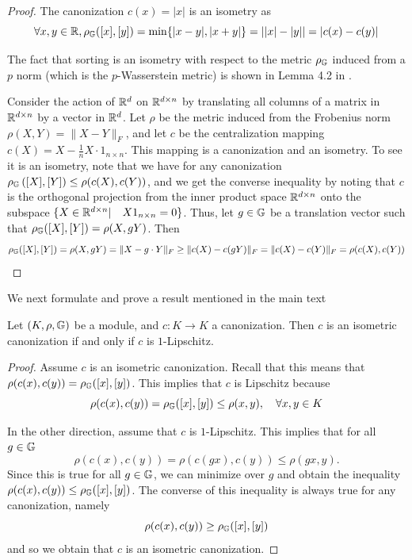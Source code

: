 \documentclass{article}
\begin{document}
\isometries*
\label{Proof_isometries}
\begin{proof}
The  canonization $c(x)=|x|$ is an isometry as
$$\forall x,y \in \mathbb{R}, \rho_{\mathbb{G}}([x],[y]) = \min\{|x-y|,|x+y|\} = ||x|-|y|| = |c(x)-c(y)|$$

The fact that sorting is an isometry with respect to the metric $\rho_{\mathbb{G}}$ induced from a $p$ norm (which is the $p$-Wasserstein metric) is shown in 
 Lemma 4.2 in  \cite{sortLemma}. 

Consider the action of $\mathbb{R}^d$ on $\mathbb{R}^{d\times n}$ by translating all columns of a matrix in $\mathbb{R}^{d\times n}$ by a vector in $\mathbb{R}^d$. Let $\rho$ be the metric induced from the Frobenius norm $\rho(X,Y)=\|X-Y\|_F $, and let $c$ be the centralization mapping $c(X)=X-\frac{1}{n}X\cdot 1_{n\times n}$. This mapping is a canonization and an isometry. To see it is an isometry, note that we have for any canonization $\rho_{\mathbb{G}}\left([X],[Y]\right) \leq \rho(c(X),c(Y))$, and we get the converse inequality by noting that $c$ is the orthogonal projection from the inner product space $\mathbb{R}^{d\times n} $ onto the subspace $\{X\in \mathbb{R}^{d\times n}| \quad X1_{n\times n}=0 \} $. Thus, let $g\in \mathbb{G}$ be a translation vector such that $\rho_{\mathbb{G}}([X],[Y])=\rho(X,gY) $. Then 
$$\rho_{\mathbb{G}}([X],[Y])=\rho(X,gY)=\|X-g\cdot Y\|_F\geq \|c(X)-c(gY)\|_F=\|c(X)-c(Y)\|_F=\rho(c(X),c(Y)) $$

\end{proof}

We next formulate and prove a result mentioned in the main text
\begin{proposition}\label{prop:isometryLip}
Let $(K,\rho,\mathbb{G}) $ be a module, and $c:K\to K$ a canonization. Then $c $ is an isometric canonization if and only if $c$ is $1$-Lipschitz.
\end{proposition}
\begin{proof}
Assume $c$ is an isometric canonization. Recall that this means that $\rho(c(x),c(y))=\rho_{\mathbb{G}}([x],[y]) $. This implies that $c$ is Lipschitz because 
$$\rho(c(x),c(y))=\rho_{\mathbb{G}}([x],[y])\leq \rho(x,y), \quad \forall x,y\in K  $$

In the other direction, assume that $c$ is $1$-Lipschitz. This implies that for all $g\in \mathbb{G}$
$$\rho(c(x),c(y))=\rho(c(gx),c(y))\leq \rho(gx,y) . $$
Since this is true for all $g\in \mathbb{G}$, we can minimize over $g$ and obtain the inequality $\rho(c(x),c(y))\leq \rho_{\mathbb{G}}([x],[y])$. The converse of this inequality is always true for any canonization, namely
$$\rho(c(x),c(y))\geq \rho_{\mathbb{G}}([x],[y]) $$
and so we obtain that $c$ is an isometric canonization. 
\end{proof}
\end{document}
